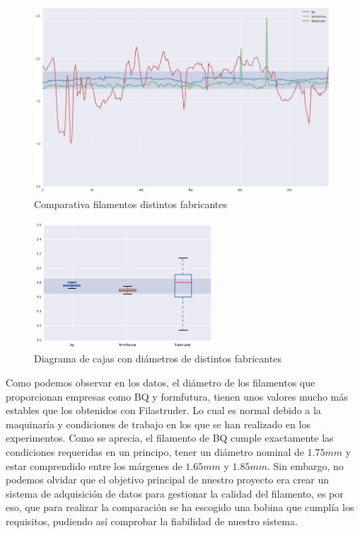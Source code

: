 \begin{figure}[H]
    \centering
    \includegraphics[width=0.99\textwidth]{images/producciones/conclusiones/output_8_1.png}
    \caption{Comparativa filamentos distintos fabricantes}
    \label{fig:concl_graf5}
\end{figure}

\begin{figure}[H]
    \centering
    \includegraphics[width=0.6\textwidth]{images/producciones/conclusiones/output_9_1.png}
    \caption{Diagrama de cajas con diámetros de distintos fabricantes}
    \label{fig:concl_cajas5}
\end{figure}

Como podemos observar en los datos, el diámetro de los filamentos que proporcionan empresas como BQ y formfutura, tienen unos valores mucho más estables que los obtenidos con Filastruder. Lo cual es normal debido a la maquinaría y condiciones de trabajo en los que se han realizado en los experimentos. Como se aprecia, el filamento de BQ cumple exactamente las condiciones requeridas en un principo, tener un diámetro nominal  de $1.75mm$ y estar comprendido entre los márgenes de $1.65mm$ y $1.85mm$. Sin embargo, no podemos olvidar que el objetivo principal de nuestro proyecto era crear un sistema de adquisición de datos para gestionar la calidad del filamento, es por eso, que para realizar la comparación se ha escogido una bobina que cumplía los requisitos, pudiendo así comprobar la fiabilidad de nuestro sistema.\\

